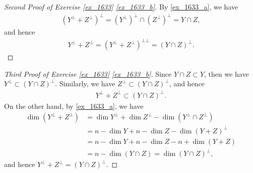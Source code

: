 \documentclass[10pt]{book}
\theoremstyle{definition}
\numberwithin{equation}{chapter}
\begin{document}
\begin{proof}[Second Proof of Exercise \ref{ex_1633} \ref{ex_1633_b}]
By \ref{ex_1633_a}, we have
\begin{align*}
    \left(Y^\bot + Z^\bot\right)^\bot = \left(Y^\bot\right)^\bot \cap \left(Z^\bot\right)^\bot = Y \cap Z,
\end{align*}
and hence
\begin{align*}
    Y^\bot + Z^\bot = \left(Y^\bot + Z^\bot\right)^{\bot\bot} = \left(Y \cap Z\right)^\bot.
\end{align*}
\end{proof}

\begin{proof}[Third Proof of Exercise \ref{ex_1633} \ref{ex_1633_b}]
Since $Y \cap Z \subset Y$, then we have $Y^\bot \subset \left(Y \cap Z\right)^\bot$. Similarly, we have $Z^\bot \subset \left(Y \cap Z\right)^\bot$, and hence
\begin{align*}
    Y^\bot + Z^\bot \subset \left(Y \cap Z\right)^\bot.
\end{align*}
On the other hand, by \ref{ex_1633_a}, we have
\begin{align*}
    \dim \left(Y^\bot + Z^\bot\right) & = \dim Y^\bot + \dim Z^\bot - \dim \left(Y^\bot \cap Z^\bot\right) \\
    & = n - \dim Y + n - \dim Z - \dim (Y + Z)^\bot \\
    & = n - \dim Y + n - \dim Z - n + \dim (Y + Z) \\
    & = n - \dim (Y \cap Z) = \dim (Y \cap Z)^\bot,
\end{align*}
and hence $Y^\bot + Z^\bot = (Y \cap Z)^\bot$.
\end{proof}

\medskip
\end{document}
